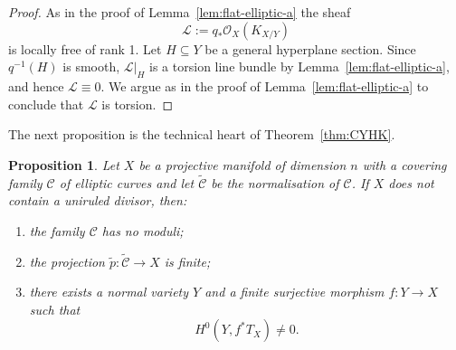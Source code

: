 \documentclass[11pt]{article}
\newtheorem{prop}[theo]{Proposition}
\theoremstyle{definition}
\numberwithin{equation}{section}
\numberwithin{figure}{section}
\numberwithin{table}{section}
\newcommand\sL{\mathcal{L}}
\newcommand\sC{\mathcal{C}}
\newcommand{\OO}{\mathcal{O}}
\begin{document}
\begin{proof}
As in the proof of Lemma~\ref{lem:flat-elliptic-a} the sheaf
\[
\sL := q_*\OO_X(K_{X/Y})
\]
is locally free of rank 1. Let $H \subseteq Y$ be a general hyperplane section. Since $q^{-1}(H)$ is smooth, $\sL\vert_H$ is a torsion line bundle by Lemma~\ref{lem:flat-elliptic-a}, and hence $\sL \equiv 0$. We argue as in the proof of Lemma~\ref{lem:flat-elliptic-a} to conclude that $\sL$ is torsion.
\end{proof}

The next proposition is the technical heart of Theorem~\ref{thm:CYHK}.
\begin{prop}\label{new1}
Let $X$ be a projective manifold of dimension $n$ with a covering family $\sC$ of elliptic curves and let $\widetilde {\sC}$ be the normalisation of $\sC$. If $X$ does not contain a uniruled divisor, then:
\begin{enumerate}
\item \label{list-6.5.1} the family $\sC$ has no moduli;
\item \label{list-6.5.2} the projection $\widetilde p\colon \widetilde {\sC} \to X$ is finite;
\item \label{list-6.5.3} there exists a normal variety $Y$ and a finite surjective morphism $f\colon Y \to X$ such that
\[
H^0(Y,f^*T_X) \neq 0.
\]
\end{enumerate}
\end{prop}
\end{document}
